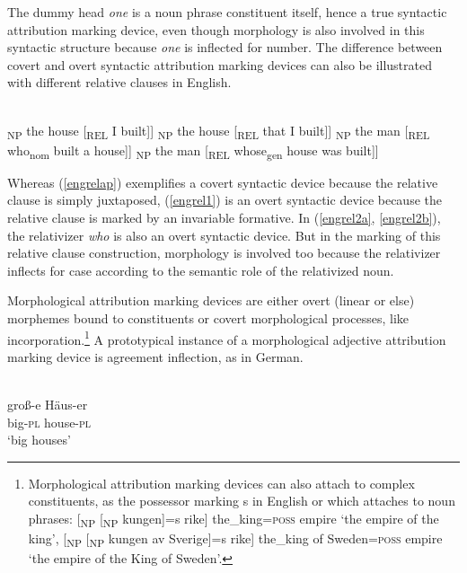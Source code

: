 The dummy head \textit{one} is a noun phrase constituent itself, hence a true syntactic attribution marking device, even though morphology is also involved in this syntactic structure because \textit{one} is inflected for number. The difference between covert and overt syntactic attribution marking devices can also be illustrated with different relative clauses in English.

\newpage
\ea
{}\\
\ea {\upshape [}\textsubscript{\rm NP} the house {\upshape [}\textsubscript{\rm REL} I built{\upshape ]]}\label{engrelap}
\ex {\upshape [}\textsubscript{\rm NP} the house {\upshape [}\textsubscript{\rm REL} that I built{\upshape ]]}\label{engrel1}
\ea {\upshape [}\textsubscript{\rm NP} the man {\upshape [}\textsubscript{\rm REL} who\textsubscript{\rm nom} built a house{\upshape ]]}\label{engrel2a}
\ex {\upshape [}\textsubscript{\rm NP} the man {\upshape [}\textsubscript{\rm REL} whose\textsubscript{\rm gen} house was built{\upshape ]]}\label{engrel2b}
\z
\z
\z

Whereas (\ref{engrelap}) exemplifies a covert syntactic device because the relative clause is simply juxtaposed, (\ref{engrel1}) is an overt syntactic device because the relative clause is marked by an invariable formative. In (\ref{engrel2a}, \ref{engrel2b}), the relativizer \textit{who} is also an overt syntactic device. But in the marking of this relative clause construction, morphology is involved too because the relativizer inflects for case according to the semantic role of the relativized noun.

Morphological attribution marking devices are either overt (linear or else) morphemes bound to constituents or covert morphological processes, like incorporation.\footnote{Morphological attribution marking devices can also attach to complex constituents, as the possessor marking s in English or  which attaches to noun phrases:  [\textsubscript{NP} [\textsubscript{NP} kungen]=s rike] the\_king=\textsc{poss} empire ‘the empire of the king’, [\textsubscript{NP} [\textsubscript{NP} kungen av Sverige]=s rike] the\_king of Sweden=\textsc{poss} empire ‘the empire of the King of Sweden’.} A prototypical instance of a morphological adjective attribution marking device is agreement inflection, as in German.

\ea
{}\\
\gll	groß-e Häus-er\\
	big-\textsc{pl} house-\textsc{pl}\\
\glt	‘big houses’
\z

